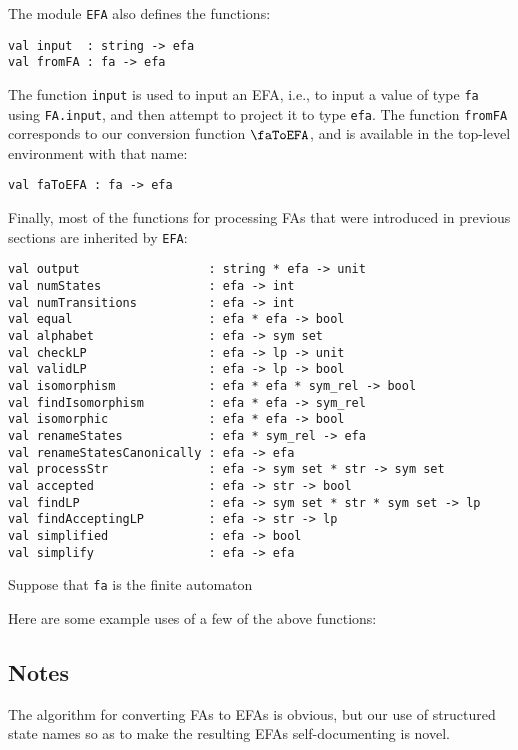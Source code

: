 The module \texttt{EFA} also defines the functions:
\begin{verbatim}
val input  : string -> efa
val fromFA : fa -> efa
\end{verbatim}
The function \texttt{input} is used to input an EFA, i.e., to input a
value of type \texttt{fa} using \texttt{FA.input}, and then attempt to
project it to type \texttt{efa}.  The function \texttt{fromFA}
corresponds to our conversion function $\faToEFA$, and is available in
the top-level environment with that name:
\begin{verbatim}
val faToEFA : fa -> efa
\end{verbatim}

Finally, most of the functions for processing FAs that were introduced
in previous sections are inherited by \texttt{EFA}:
\begin{verbatim}
val output                  : string * efa -> unit 
val numStates               : efa -> int
val numTransitions          : efa -> int
val equal                   : efa * efa -> bool
val alphabet                : efa -> sym set
val checkLP                 : efa -> lp -> unit
val validLP                 : efa -> lp -> bool
val isomorphism             : efa * efa * sym_rel -> bool
val findIsomorphism         : efa * efa -> sym_rel
val isomorphic              : efa * efa -> bool
val renameStates            : efa * sym_rel -> efa
val renameStatesCanonically : efa -> efa
val processStr              : efa -> sym set * str -> sym set
val accepted                : efa -> str -> bool
val findLP                  : efa -> sym set * str * sym set -> lp
val findAcceptingLP         : efa -> str -> lp
val simplified              : efa -> bool
val simplify                : efa -> efa
\end{verbatim}

Suppose that \texttt{fa} is the finite automaton
\begin{center}

\end{center}
Here are some example uses of a few of the above functions:


\subsection{Notes}

The algorithm for converting FAs to EFAs is obvious, but our use of
structured state names so as to make the resulting EFAs
self-documenting is novel.

